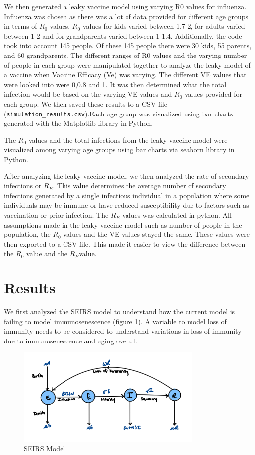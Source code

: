 \documentclass{report}
\begin{document}
We then generated a leaky vaccine model using varying R0 values for influenza. Influenza was chosen as there was a lot of data provided for different age groups in terms of $R_0$ values. $R_0$ values for kids varied between 1.7-2, for adults varied between 1-2 and for grandparents varied between 1-1.4. Additionally, the code took into account 145 people. Of these 145 people there were 30 kids, 55 parents, and 60 grandparents. The different ranges of R0 values and the varying number of people in each group were manipulated together to analyze the leaky model of a vaccine when Vaccine Efficacy (Ve) was varying. The different VE values that were looked into were 0,0.8 and 1. It was then determined what the total infection would be based on the varying VE values and $R_0$ values provided for each group. We then saved these results to a CSV file (\texttt{simulation\_results.csv}).Each age group was visualized using bar charts generated with the Matplotlib library in Python.

 The \(R_{0}\) values and the total infections from the leaky vaccine model were visualized among varying age groups using bar charts via seaborn library in Python. 

 After analyzing the leaky vaccine model, we then analyzed the rate of secondary infections or \(R_{E}\). This value determines the average number of secondary infections generated by a single infectious individual in a population where some individuals may be immune or have reduced susceptibility due to factors such as vaccination or prior infection. The \(R_{E}\) values was calculated in python. All assumptions made in the leaky vaccine model such as number of people in the population, the \(R_{0}\) values and the VE values stayed the same. These values were then exported to a CSV file. This made it easier to view the difference between the \(R_{0}\) value and the \(R_{E}\)value. 

\section*{Results}
We first analyzed the SEIRS model to understand how the current model is failing to model immunosenescence (figure 1). A variable to model loss of immunity needs to be considered to understand variations in loss of immunity due to immunosenescence and aging overall.

\begin{figure}[H]
    \centering
    \includegraphics[width=0.8\textwidth]{seirs.jpeg}
    \caption{SEIRS Model}
    \label{fig:SEIRS}
\end{figure}
\end{document}
